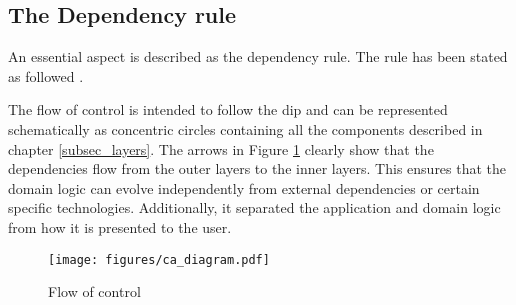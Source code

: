 \subsection{The Dependency rule} \label{sebsec:dependency_rule}

An essential aspect is described as the dependency rule. The rule has been stated as
followed \parencite[206]{robert_c_martin_clean_2018}.


The flow of control is intended to follow the \gls{dip} and can be represented
schematically as concentric circles containing all the components described in chapter
\ref{subsec_layers}. The arrows in Figure \ref{fig_modulair_components} clearly show that
the dependencies flow from the outer layers to the inner layers. This ensures that the
domain logic can evolve independently from external dependencies or certain specific
technologies. Additionally, it separated the application and domain logic from how it is
presented to the user. 

\begin{figure}[H]
    \centering
    \texttt{[image: figures/ca\_diagram.pdf]}
    \caption[Flow of control]{Flow of control}
    \label{fig_modulair_components}
\end{figure}